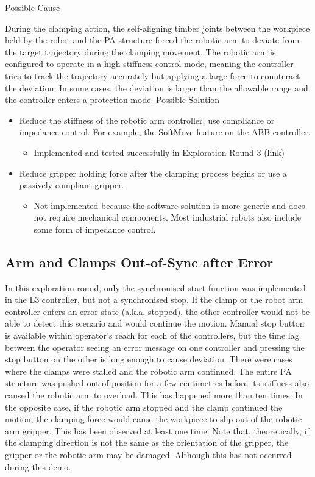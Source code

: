 Possible Cause

During the clamping action, the self-aligning timber joints between the workpiece held by the robot and the PA structure forced the robotic arm to deviate from the target trajectory during the clamping movement. The robotic arm is configured to operate in a high-stiffness control mode, meaning the controller tries to track the trajectory accurately but applying a large force to counteract the deviation. In some cases, the deviation is larger than the allowable range and the controller enters a protection mode.
Possible Solution
\begin{itemize}
    \item Reduce the stiffness of the robotic arm controller, use compliance or impedance control. For example, the SoftMove feature on the ABB controller.
    \begin{itemize}
        \item Implemented and tested successfully in Exploration Round 3 (link)
    \end{itemize}
    \item Reduce gripper holding force after the clamping process begins or use a passively compliant gripper.
    \begin{itemize}
        \item Not implemented because the software solution is more generic and does not require mechanical components. Most industrial robots also include some form of impedance control.
    \end{itemize}
\end{itemize}

\subsection{Arm and Clamps Out-of-Sync after Error}
\label{subsection:exploration-2-arm-and-clamps-out-of-sync-after-error}

In this exploration round, only the synchronised start function was implemented in the L3 controller, but not a synchronised stop. If the clamp or the robot arm controller enters an error state (a.k.a. stopped), the other controller would not be able to detect this scenario and would continue the motion. Manual stop button is available within operator’s reach for each of the controllers, but the time lag between the operator seeing an error message on one controller and pressing the stop button on the other is long enough to cause deviation.
There were cases where the clamps were stalled and the robotic arm continued. The entire PA structure was pushed out of position for a few centimetres before its stiffness also caused the robotic arm to overload. This has happened more than ten times.
In the opposite case, if the robotic arm stopped and the clamp continued the motion, the clamping force would cause the workpiece to slip out of the robotic arm gripper. This has been observed at least one time.
Note that, theoretically, if the clamping direction is not the same as the orientation of the gripper, the gripper or the robotic arm may be damaged. Although this has not occurred during this demo.


